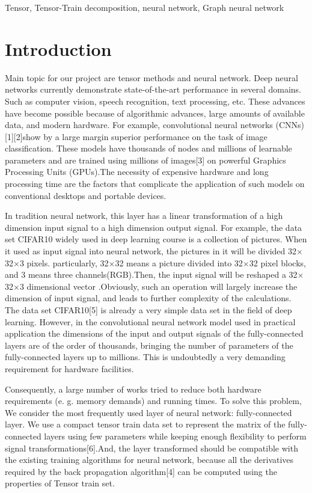 \documentclass[onecolumn, conference]{IEEEtran}
\begin{document}
\begin{IEEEkeywords}
Tensor, Tensor-Train decomposition, neural network, Graph neural network
\end{IEEEkeywords}

\section{Introduction}
\par Main topic for our project are tensor methods and neural network. Deep neural networks currently demonstrate state-of-the-art performance in several domains. Such as computer vision, speech recognition, text processing, etc. 
These advances have become possible because of algorithmic advances, large amounts of available data, and modern hardware. For example, convolutional neural networks (CNNs) [1][2]show by a large margin superior performance on the task of image classification. 
These models have thousands of nodes and millions of learnable parameters and are trained using millions of images[3] on powerful Graphics Processing Units (GPUs).The necessity of expensive hardware and long processing time are the factors that complicate the application of such models on conventional desktops and portable devices.
\par In tradition neural network, this layer has a linear transformation of a high dimension input signal to a high dimension output signal. For example, the data set CIFAR10 widely used in deep learning course is a collection of pictures. When it used as input signal into neural network, the pictures in it will be divided 32$\times$32$\times$3 pixels. particularly, 32$\times$32 means a picture divided into 32$\times$32 pixel blocks, and 3 means three channels(RGB).Then, the input signal will be reshaped a 32$\times$32$\times$3 dimensional vector .Obviously, such an operation will largely increase the dimension of input signal, and leads to  further complexity of the calculations. 
The data set CIFAR10[5] is already a very simple data set in the field of deep learning. However, in the convolutional neural network model used in practical application the dimensions of the input and output signals of the fully-connected layers are of the order of thousands, bringing the number of parameters of the fully-connected layers up to millions. This is undoubtedly a very demanding requirement for hardware facilities.
\par Consequently, a large number of works tried to reduce both hardware requirements (e. g. memory demands) and running times. To solve this problem, We consider the most frequently used layer of neural network: fully-connected layer. We use a compact tensor train data set to represent the matrix of the fully-connected layers using few parameters while keeping enough flexibility to perform signal transformations[6].And, the layer transformed should be compatible with the existing training algorithms for neural network, because all the derivatives required by the back propagation algorithm[4] can be computed using the properties of Tensor train set.
\end{document}
